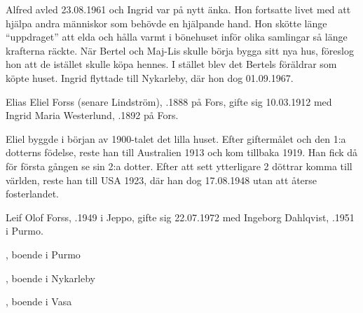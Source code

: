 Alfred avled 23.08.1961 och Ingrid var på nytt änka. Hon fortsatte livet med att hjälpa andra människor som behövde en hjälpande hand. Hon skötte länge ``uppdraget'' att elda och hålla varmt i bönehuset inför olika samlingar så länge krafterna räckte. När Bertel och Maj-Lis skulle börja bygga sitt nya hus, föreslog hon att de istället skulle köpa hennes. I stället blev det Bertels föräldrar som köpte huset. Ingrid flyttade till Nykarleby, där hon dog 01.09.1967.


%
Elias Eliel Forss (senare Lindström), .1888 på Fors, gifte sig 10.03.1912 med Ingrid Maria Westerlund, .1892  på Fors.

Eliel byggde i början av 1900-talet det lilla huset. Efter giftermålet och den 1:a dotterns födelse, reste han till Australien 1913 och kom tillbaka 1919. Han fick då för första gången se sin 2:a dotter. Efter att sett ytterligare 2 döttrar komma till världen, reste han till USA 1923, där han dog 17.08.1948 utan att återse fosterlandet.
\begin{jhchildren}
  \item {}
  \item {}
  \item {}
  \item {}
\end{jhchildren}



%



%
Leif Olof Forss, .1949 i Jeppo, gifte sig 22.07.1972 med Ingeborg Dahlqvist, .1951 i Purmo.
\begin{jhchildren}
  \item {}, boende i Purmo
  \item {}, boende i Nykarleby
  \item {}, boende i Vasa
\end{jhchildren}

